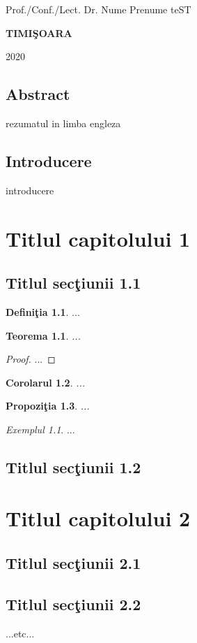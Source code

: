 \documentclass[12pt,a4paper]{report}
\newtheorem{thm}{Teorema}[section]
\newtheorem{cor}[thm]{Corolarul}
\newtheorem{prop}[thm]{Propozi\c tia}
\theoremstyle{definition}
\newtheorem{defn}{Defini\c tia}[section]
\theoremstyle{remark}
\newtheorem{exmp}{Exemplul}[section]
\begin{document}
{\large{}

\noindent Prof./Conf./Lect. Dr. Nume Prenume \hfill teST}

\vfill
\begin{center}
{\bf TIMI\c SOARA

2020}
\end{center}
\newpage
\normalsize{}
\section*{Abstract}
rezumatul in limba engleza
\tableofcontents
\newpage
\section*{Introducere}

introducere
\chapter{Titlul capitolului 1}
\section{Titlul sec\c tiunii 1.1}
\begin{defn} ...
\end{defn}
\begin{thm} ...
\end{thm}
\begin{proof} ...
\end{proof}
\begin{cor} ...
\end{cor}
\begin{prop} ...
\end{prop}
\begin{exmp} ...
\end{exmp}

\section{Titlul sec\c tiunii 1.2}
\cite{Bersani}
\chapter{Titlul capitolului 2}
\section{Titlul sec\c tiunii 2.1}
\section{Titlul sec\c tiunii 2.2}
...etc...



\end{document}
